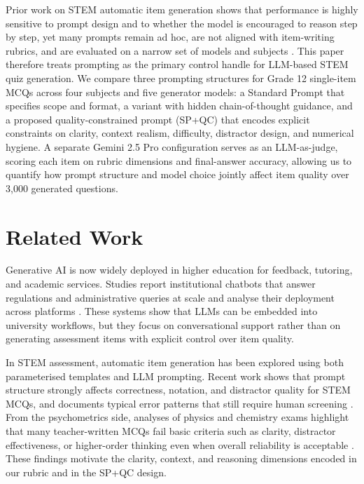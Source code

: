 \documentclass[a4paper,conference]{IEEEtran}
\begin{document}
Prior work on STEM automatic item generation shows that performance is highly sensitive to prompt design and to whether the model is encouraged to reason step by step, yet many prompts remain ad hoc, are not aligned with item-writing rubrics, and are evaluated on a narrow set of models and subjects \cite{chan2025,rahmah2020}. This paper therefore treats prompting as the primary control handle for LLM-based STEM quiz generation. We compare three prompting structures for Grade 12 single-item MCQs across four subjects and five generator models: a Standard Prompt that specifies scope and format, a variant with hidden chain-of-thought guidance, and a proposed quality-constrained prompt (SP+QC) that encodes explicit constraints on clarity, context realism, difficulty, distractor design, and numerical hygiene. A separate Gemini 2.5 Pro configuration serves as an LLM-as-judge, scoring each item on rubric dimensions and final-answer accuracy, allowing us to quantify how prompt structure and model choice jointly affect item quality over 3{,}000 generated questions.

\section{Related Work}

Generative AI is now widely deployed in higher education for feedback, tutoring, and academic services. Studies report institutional chatbots that answer regulations and administrative queries at scale and analyse their deployment across platforms \cite{genAIHigherEdu,muna2025siakif,acmEval2}. These systems show that LLMs can be embedded into university workflows, but they focus on conversational support rather than on generating assessment items with explicit control over item quality.

In STEM assessment, automatic item generation has been explored using both parameterised templates and LLM prompting. Recent work shows that prompt structure strongly affects correctness, notation, and distractor quality for STEM MCQs, and documents typical error patterns that still require human screening \cite{chan2025,acmEval1}. From the psychometrics side, analyses of physics and chemistry exams highlight that many teacher-written MCQs fail basic criteria such as clarity, distractor effectiveness, or higher-order thinking even when overall reliability is acceptable \cite{rahmah2020,ijies2023}. These findings motivate the clarity, context, and reasoning dimensions encoded in our rubric and in the SP+QC design.
\end{document}
